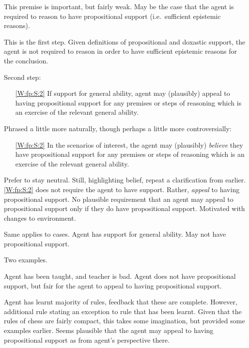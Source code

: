 \begin{note}
  This premise is important, but fairly weak.
  May be the case that the agent is required to reason to have propositional support (i.e.\ sufficient epistemic reasons).
\end{note}

\begin{note}
  This is the first step.
  Given definitions of propositional and doxastic support, the agent is not required to reason in order to have sufficient epistemic reasons for the conclusion.
\end{note}

\begin{note}
  Second step:
  \begin{enumerate}
  \item[\ref{W:fp:S:2}] If support for general ability, agent may (plausibly) appeal to having propositional support for any premises or steps of reasoning which is an exercise of the relevant general ability.
  \end{enumerate}
  Phrased a little more naturally, though perhaps a little more controversially:
  \begin{enumerate}
  \item[\ref{W:fp:S:2}] In the scenarios of interest, the agent may (plausibly) \emph{believe} they have propositional support for any premises or steps of reasoning which is an exercise of the relevant general ability.
  \end{enumerate}
  Prefer to stay neutral.
  Still, highlighting belief, repeat a clarification from earlier.
  \ref{W:fp:S:2} does not require the agent to have support.
  Rather, \emph{appeal} to having propositional support.
  No plausible requirement that an agent may appeal to propositional support only if they do have propositional support.
  Motivated with changes to environment.

  Same applies to cases.
  Agent has support for general ability.
  May not have propositional support.

  Two examples.

  Agent has been taught, and teacher is bad.
  Agent does not have propositional support, but fair for the agent to appeal to having propositional support.

  Agent has learnt majority of rules, feedback that these are complete.
  However, additional rule stating an exception to rule that has been learnt.
  Given that the rules of chess are fairly compact, this takes some imagination, but provided some examples earlier.
  Seems plausible that the agent may appeal to having propositional support as from agent's perspective there.


\end{note}
